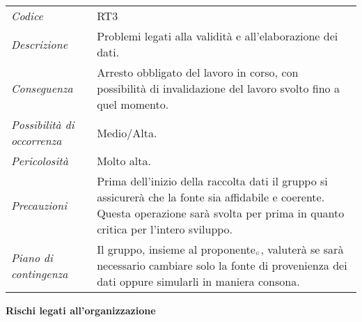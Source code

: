 {{{	\begin{center}
		\renewcommand{\arraystretch}{1.4}
		\begin{longtable}{|p{5cm}|p{12cm}|}
			\hline
			\rowcolor{airforceblue}
			\multicolumn{2}{|c|}{\textit{Validità dei dati}}\\
			\hline
			\textit{Codice} & RT3 \\
			\hline
			\textit{Descrizione} & Problemi legati alla validità e all'elaborazione dei dati. \\
			\hline
			\textit{Conseguenza} & Arresto obbligato del lavoro in corso, con possibilità di invalidazione del lavoro svolto fino a quel momento. \\
			\hline
			\textit{Possibilità di occorrenza} & Medio/Alta. \\
			\hline
			\textit{Pericolosità} & Molto alta. \\
			\hline
			\textit{Precauzioni} & Prima dell'inizio della raccolta dati il gruppo si assicurerà che la fonte sia affidabile e coerente.
			Questa operazione sarà svolta per prima in quanto critica per l'intero sviluppo.  \\
			\hline
			\textit{Piano di contingenza} & Il gruppo, insieme al proponente$_{\scaleto{G}{3pt}}$, valuterà se sarà necessario cambiare solo la fonte di provenienza dei dati oppure simularli in maniera consona. \\
			\hline
		\end{longtable}
	\end{center}

\quad
\begin{center}
	\LARGE\textbf{Rischi legati all'organizzazione}
\end{center}

\def\tabularxcolumn#1{m{#1}}
{

}}}}
